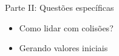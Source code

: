 \begin{frame}[plain]
    \centering
    \vspace{0.5cm}
    \Huge Parte II: Questões específicas
    
    \vspace{0.7cm}
    \large
    \begin{itemize}
        \item Como lidar com colisões?
        \item Gerando valores iniciais
    \end{itemize}
\end{frame}


